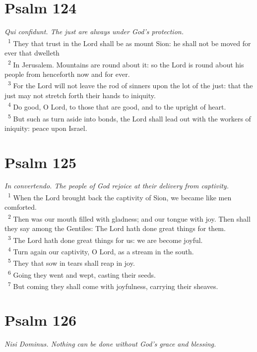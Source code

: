 \documentclass[a5paper,12pt]{article}
\begin{document}
\begin{multicols*}{2}
\section{Psalm 124}
\label{sec:org3ad52fc}
\emph{Qui confidunt. The just are always under God's protection.}\\

~\textsuperscript{1} They that trust in the Lord shall be as mount Sion: he shall not be moved for ever that dwelleth\\
~\textsuperscript{2} In Jerusalem. Mountains are round about it: so the Lord is round about his people from henceforth now and for ever.\\
~\textsuperscript{3} For the Lord will not leave the rod of sinners upon the lot of the just: that the just may not stretch forth their hands to iniquity.\\
~\textsuperscript{4} Do good, O Lord, to those that are good, and to the upright of heart.\\
~\textsuperscript{5} But such as turn aside into bonds, the Lord shall lead out with the workers of iniquity: peace upon Israel.\\

\section{Psalm 125}
\label{sec:orgfe959fb}
\emph{In convertendo. The people of God rejoice at their delivery from captivity.}\\

~\textsuperscript{1} When the Lord brought back the captivity of Sion, we became like men comforted.\\
~\textsuperscript{2} Then was our mouth filled with gladness; and our tongue with joy. Then shall they say among the Gentiles: The Lord hath done great things for them.\\
~\textsuperscript{3} The Lord hath done great things for us: we are become joyful.\\
~\textsuperscript{4} Turn again our captivity, O Lord, as a stream in the south.\\
~\textsuperscript{5} They that sow in tears shall reap in joy.\\
~\textsuperscript{6} Going they went and wept, casting their seeds.\\
~\textsuperscript{7} But coming they shall come with joyfulness, carrying their sheaves.\\

\section{Psalm 126}
\label{sec:orgf9776de}
\emph{Nisi Dominus. Nothing can be done without God's grace and blessing.}\\


\end{multicols*}
\end{document}
